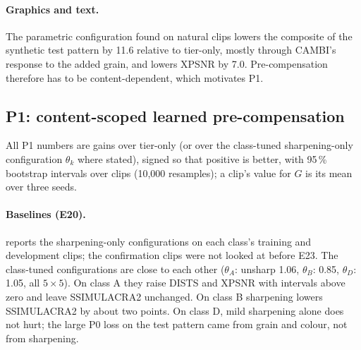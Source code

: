 \paragraph{Graphics and text.}
The parametric configuration found on natural clips lowers the composite of the synthetic test
pattern by 11.6 relative to tier-only, mostly through CAMBI's response to the added grain, and lowers
XPSNR by 7.0. Pre-compensation therefore has to be content-dependent, which motivates P1.

\subsection{P1: content-scoped learned pre-compensation}
\label{sec:results-p1}

All P1 numbers are gains over tier-only (or over the class-tuned sharpening-only configuration
$\theta_k$ where stated), signed so that positive is better, with 95\,\% bootstrap intervals over
clips (10{,}000 resamples); a clip's value for $G$ is its mean over three seeds.

\paragraph{Baselines (E20).}
 reports the sharpening-only configurations on each class's training and development
clips; the confirmation clips were not looked at before E23. The class-tuned configurations are
close to each other ($\theta_A$: unsharp 1.06, $\theta_B$: 0.85, $\theta_D$: 1.05, all $5\times5$).
On class A they raise DISTS and XPSNR with intervals above zero and leave SSIMULACRA2 unchanged. On
class B sharpening lowers SSIMULACRA2 by about two points. On class D, mild sharpening alone does
not hurt; the large P0 loss on the test pattern came from grain and colour, not from sharpening.

